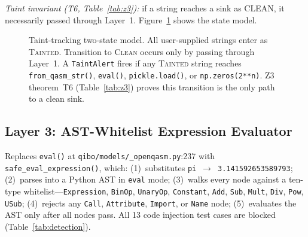 \documentclass[conference,compsoc]{IEEEtran}
\begin{document}
\textit{Taint invariant (T6, Table~\ref{tab:z3}):} if a string
reaches a sink as CLEAN, it necessarily passed through Layer~1.
Figure~\ref{fig:taint} shows the state model.
\begin{figure}[!ht]
\centering
{}
\caption{Taint-tracking two-state model. All user-supplied strings
  enter as \textsc{Tainted}. Transition to \textsc{Clean} occurs only
  by passing through Layer~1. A \texttt{TaintAlert} fires if any
  \textsc{Tainted} string reaches \texttt{from\_qasm\_str()},
  \texttt{eval()}, \texttt{pickle.load()}, or \texttt{np.zeros(2**n)}.
  Z3 theorem~T6 (Table~\ref{tab:z3}) proves this transition is the
  only path to a clean sink.}
\label{fig:taint}
\end{figure}

\subsection{Layer 3: AST-Whitelist Expression Evaluator}
\noindent Replaces \texttt{eval()} at \texttt{qibo/models/\_openqasm.py}:237
with \texttt{safe\_eval\_expression()}, which:
(1)~substitutes \texttt{pi}~$\to$~\texttt{3.141592653589793};
(2)~parses into a Python AST in \texttt{eval} mode;
(3)~walks every node against a ten-type whitelist---\texttt{Expression},
\texttt{BinOp}, \texttt{UnaryOp}, \texttt{Constant}, \texttt{Add},
\texttt{Sub}, \texttt{Mult}, \texttt{Div}, \texttt{Pow}, \texttt{USub};
(4)~rejects any \texttt{Call}, \texttt{Attribute}, \texttt{Import},
or \texttt{Name} node;
(5)~evaluates the AST only after all nodes pass.
All 13 code injection test cases are blocked
(Table~\ref{tab:detection}).
\end{document}

